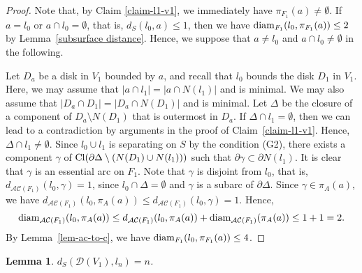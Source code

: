 \documentclass[]{aspm}
\newtheorem{lemma}[definition]{Lemma}
\begin{document}
\begin{proof}
Note that, by Claim \ref{claim-l1-v1}, we immediately have $\pi_{F_1}(a)\neq \emptyset$. 
If $a=l_0$ or $a\cap l_0=\emptyset$, that is, $d_S(l_0,a)\leq 1$, then we have ${\rm diam}_{F_1}(l_0, \pi_{F_1}(a))\leq 2$ by Lemma~\ref{subsurface distance}.
Hence, we suppose that $a\ne l_0$ and $a\cap l_0\ne\emptyset$ in the following.

Let $D_a$ be a disk in $V_1$ bounded by $a$, and recall that $l_0$ bounds the disk $D_1$ in $V_1$.
Here, we may assume that $|a\cap l_1|=|a\cap N(l_1)|$ and is minimal. 
We may also assume that $|D_a\cap D_1|=|D_a\cap N(D_1)|$ and is minimal.
Let $\Delta$ be the closure of a component of $D_a\setminus N(D_1)$ that is outermost in $D_a$.
If $\Delta\cap l_1=\emptyset$, then we can lead to a contradiction by arguments in the proof of Claim~\ref{claim-l1-v1}.
Hence, $\Delta\cap l_1\ne\emptyset$.
Since $l_0\cup l_1$ is separating on $S$ by the condition (G2), there exists a component $\gamma$ of ${\rm Cl}(\partial\Delta \setminus (N(D_1)\cup N(l_1)))$ such that $\partial \gamma \subset \partial N(l_1)$.
It is clear that $\gamma$ is an essential arc on $F_1$.
Note that $\gamma$ is disjoint from $l_0$, that is, $d_{\mathcal{AC}(F_1)}(l_0,\gamma)=1$, since $l_0\cap \Delta=\emptyset$ and $\gamma$ is a subarc of $\partial \Delta$.
Since $\gamma\in \pi_A(a)$, we have $d_{\mathcal{AC}(F_1)}(l_0,\pi_A(a))\leq d_{\mathcal{AC}(F_1)}(l_0,\gamma)=1$.
Hence, 
$${\rm diam}_{\mathcal{AC}(F_1)}(l_0,\pi_A(a))\leq d_{\mathcal{AC}(F_1)}(l_0,\pi_A(a))+{\rm diam}_{\mathcal{AC}(F_1)}(\pi_A(a))\leq 1+1=2.$$
By Lemma~\ref{lem-ac-to-c}, we have ${\rm diam}_{F_1}(l_0,\pi_{F_1}(a))\leq 4$.
\end{proof}


\begin{lemma}\label{lem-h1}
$d_{S} (\mathcal{D}(V_1), l_n)=n$.
\end{lemma}
\end{document}
